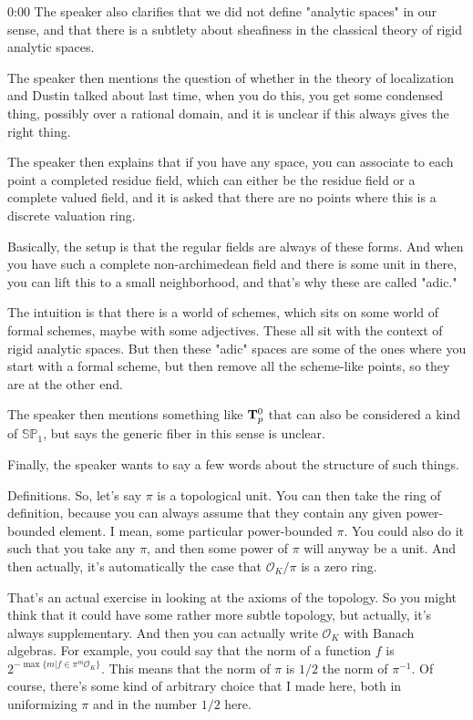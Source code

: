 \begin{unfinished}{0:00}
The speaker also clarifies that we did not define "analytic spaces" in our sense, and that there is a subtlety about sheafiness in the classical theory of rigid analytic spaces.

The speaker then mentions the question of whether in the theory of localization and Dustin talked about last time, when you do this, you get some condensed thing, possibly over a rational domain, and it is unclear if this always gives the right thing.

The speaker then explains that if you have any space, you can associate to each point a completed residue field, which can either be the residue field or a complete valued field, and it is asked that there are no points where this is a discrete valuation ring.

Basically, the setup is that the regular fields are always of these forms. And when you have such a complete non-archimedean field and there is some unit in there, you can lift this to a small neighborhood, and that's why these are called "adic."

The intuition is that there is a world of schemes, which sits on some world of formal schemes, maybe with some adjectives. These all sit with the context of rigid analytic spaces. But then these "adic" spaces are some of the ones where you start with a formal scheme, but then remove all the scheme-like points, so they are at the other end.

The speaker then mentions something like $\mathbf T_p^0$ that can also be considered a kind of $\mathbb{SP}_1$, but says the generic fiber in this sense is unclear.

Finally, the speaker wants to say a few words about the structure of such things.

Definitions. So, let's say $\pi$ is a topological unit. You can then take the ring of definition, because you can always assume that they contain any given power-bounded element. I mean, some particular power-bounded $\pi$. You could also do it such that you take any $\pi$, and then some power of $\pi$ will anyway be a unit. And then actually, it's automatically the case that $\mathcal{O}_K/\pi$ is a zero ring.

That's an actual exercise in looking at the axioms of the topology. So you might think that it could have some rather more subtle topology, but actually, it's always supplementary. And then you can actually write $\mathcal{O}_K$ with Banach algebras. For example, you could say that the norm of a function $f$ is $2^{-\max\{m|f\in\pi^m\mathcal{O}_K\}}$. This means that the norm of $\pi$ is $1/2$ the norm of $\pi^{-1}$. Of course, there's some kind of arbitrary choice that I made here, both in uniformizing $\pi$ and in the number $1/2$ here.


\end{unfinished}
